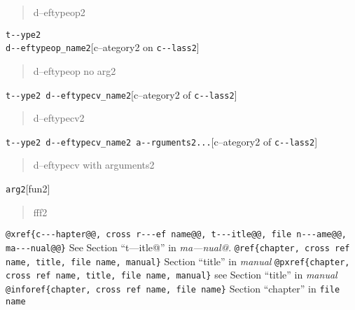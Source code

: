 \documentclass{book}
\begin{document}
\begin{titlepage}
%
\begin{quote}
\unskip{\parskip=0pt\noindent}%
d--eftypeop2
\end{quote}

\noindent\texttt{t{-}{-}ype2\leavevmode{}\\d{-}{-}eftypeop\_name2}\hfill[c--ategory2 on \texttt{c{-}{-}lass2}]



%
\begin{quote}
\unskip{\parskip=0pt\noindent}%
d--eftypeop no arg2
\end{quote}

\noindent\texttt{t{-}{-}ype2 d{-}{-}eftypecv\_name2}\hfill[c--ategory2 of \texttt{c{-}{-}lass2}]



%
\begin{quote}
\unskip{\parskip=0pt\noindent}%
d--eftypecv2
\end{quote}

\noindent\texttt{t{-}{-}ype2 d{-}{-}eftypecv\_name2 a{-}{-}rguments2...}\hfill[c--ategory2 of \texttt{c{-}{-}lass2}]



%
\begin{quote}
\unskip{\parskip=0pt\noindent}%
d--eftypecv with arguments2
\end{quote}

\noindent\texttt{arg2}\hfill[fun2]



%
\begin{quote}
\unskip{\parskip=0pt\noindent}%
fff2
\end{quote}


\texttt{@xref\{c{-}{-}{-}hapter@@, cross r{-}{-}{-}ef name@@, t{-}{-}{-}itle@@, file n{-}{-}{-}ame@@, ma{-}{-}{-}nual@@\}} See Section ``t---itle@'' in \textsl{ma---nual@}.
\texttt{@ref\{chapter, cross ref name, title, file name, manual\}} Section ``title'' in \textsl{manual}
\texttt{@pxref\{chapter, cross ref name, title, file name, manual\}} see Section ``title'' in \textsl{manual}
\texttt{@inforef\{chapter, cross ref name, file name\}} Section ``chapter'' in \texttt{file name}


\end{titlepage}
\end{document}
